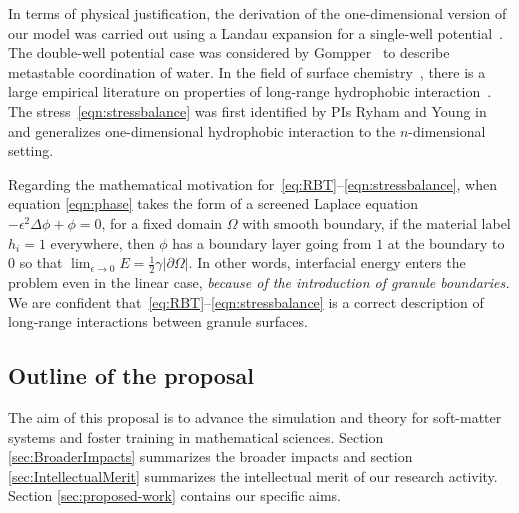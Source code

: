 In terms of physical justification, the derivation of the
one-dimensional version of our model was carried out using a Landau
expansion for a single-well potential~\cite{MaRa76, ErLjCl89}.
The double-well potential case was
considered by Gompper~\cite{GoHaKo94} to describe metastable
coordination of water. In the field of surface
chemistry~\cite{Israelachvili1954}, there is a large empirical
literature on properties of long-range hydrophobic
interaction~\cite{LeRaPa77, KoNa15, Nagle17, Lum1999, Lin2005,
Meyer2006, Ducker2016, Jackson2016, Gletal88, Aketal17, Ch05}. The
stress~\eqref{eqn:stressbalance} was first identified by PIs Ryham and
Young in~\cite{Fu2018_SIAM} and generalizes one-dimensional hydrophobic
interaction to the $n$-dimensional setting. 

Regarding the mathematical motivation for~\eqref{eq:RBT}--\eqref{eqn:stressbalance},
when equation \eqref{eqn:phase} takes the form of a screened Laplace equation
$-\epsilon^2 \Delta \phi + \phi =0$, for a fixed domain $\Omega$ with
smooth boundary, if the material label $h_i = 1$
everywhere, then $\phi$ has a boundary layer going from $1$ at the
boundary to $0$ so that 
$\lim_{\epsilon \to 0} E = \frac{1}{2}\gamma |\partial \Omega|$.
In other words, 
interfacial energy enters the problem even in the linear case,
\emph{because of the introduction of granule boundaries.}
We are confident
that~\eqref{eq:RBT}--\eqref{eqn:stressbalance} is a correct description
of long-range interactions between granule surfaces.


\subsection{Outline of the proposal}
The aim of this proposal is to advance the simulation
and theory for soft-matter systems
and foster training in mathematical sciences.
Section \ref{sec:BroaderImpacts} summarizes the broader
impacts and section \ref{sec:IntellectualMerit} summarizes the intellectual merit of our research activity.
Section \ref{sec:proposed-work} contains our
specific aims.




